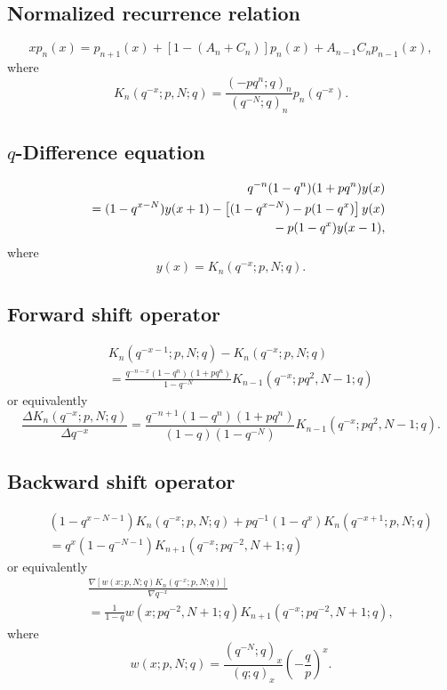 \documentclass[envcountchap,graybox]{svmono}
\newcommand{\mathindent}{\hspace{7.5mm}}
\begin{document}
\subsection*{Normalized recurrence relation}
\begin{equation}
\label{NormRecqKrawtchouk}
xp_n(x)=p_{n+1}(x)+\left[1-(A_n+C_n)\right]p_n(x)+A_{n-1}C_np_{n-1}(x),
\end{equation}
where
$$K_n(q^{-x};p,N;q)=\frac{(-pq^n;q)_n}{(q^{-N};q)_n}p_n(q^{-x}).$$

\subsection*{$q$-Difference equation}
\begin{eqnarray}
\label{dvqKrawtchouk}
& &q^{-n}(1-q^n)(1+pq^n)y(x)\nonumber\\
& &{}=(1-q^{x-N})y(x+1)-\left[(1-q^{x-N})-p(1-q^x)\right]y(x)\nonumber\\
& &{}\mathindent{}-p(1-q^x)y(x-1),
\end{eqnarray}
where
$$y(x)=K_n(q^{-x};p,N;q).$$

\subsection*{Forward shift operator}
\begin{eqnarray}
\label{shift1qKrawtchoukI}
& &K_n(q^{-x-1};p,N;q)-K_n(q^{-x};p,N;q)\nonumber\\
& &{}=\frac{q^{-n-x}(1-q^n)(1+pq^n)}{1-q^{-N}}K_{n-1}(q^{-x};pq^2,N-1;q)
\end{eqnarray}
or equivalently
\begin{equation}
\label{shift1qKrawtchoukII}
\frac{\Delta K_n(q^{-x};p,N;q)}{\Delta q^{-x}}=
\frac{q^{-n+1}(1-q^n)(1+pq^n)}{(1-q)(1-q^{-N})}K_{n-1}(q^{-x};pq^2,N-1;q).
\end{equation}

\subsection*{Backward shift operator}
\begin{eqnarray}
\label{shift2qKrawtchoukI}
& &(1-q^{x-N-1})K_n(q^{-x};p,N;q)+pq^{-1}(1-q^x)K_n(q^{-x+1};p,N;q)\nonumber\\
& &{}=q^x(1-q^{-N-1})K_{n+1}(q^{-x};pq^{-2},N+1;q)
\end{eqnarray}
or equivalently
\begin{eqnarray}
\label{shift2qKrawtchoukII}
& &\frac{\nabla\left[w(x;p,N;q)K_n(q^{-x};p,N;q)\right]}{\nabla q^{-x}}\nonumber\\
& &{}=\frac{1}{1-q}w(x;pq^{-2},N+1;q)K_{n+1}(q^{-x};pq^{-2},N+1;q),
\end{eqnarray}
where
$$w(x;p,N;q)=\frac{(q^{-N};q)_x}{(q;q)_x}\left(-\frac{q}{p}\right)^x.$$
\end{document}

